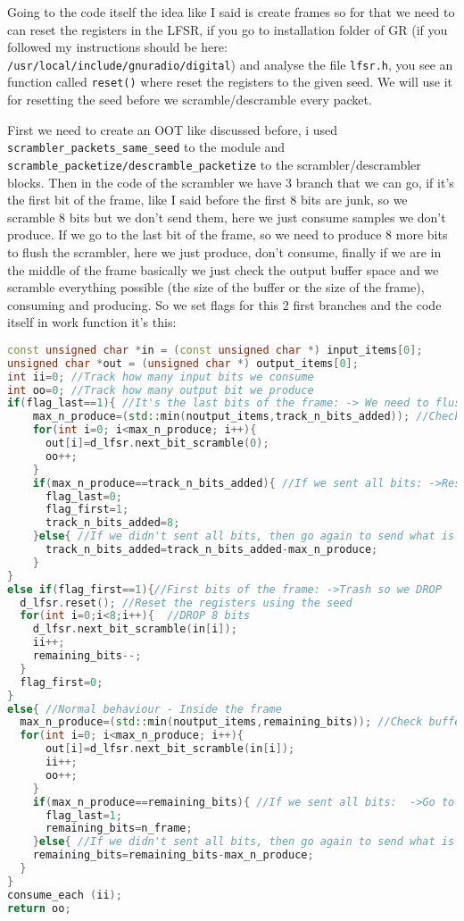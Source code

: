 \documentclass[a4paper, 10pt, conference]{ieeeconf}      %
\begin{document}
    Going to the code itself the idea like I said is create frames so for that we need to can reset the registers in the LFSR, if you go to installation folder of GR (if you followed my instructions should be here: \verb|/usr/local/include/gnuradio/digital|) and analyse the file \verb|lfsr.h|, you see an function called \verb|reset()| where reset the registers to the given seed. We will use it for resetting the seed before we scramble/descramble every packet.
    
    First we need to create an OOT like discussed before, i used \verb|scrambler_packets_same_seed| to the module and \verb|scramble_packetize/descramble_packetize| to the scrambler/descrambler blocks. Then in the code of the scrambler we have 3 branch that we can go, if it's the first bit of the frame, like I said before the first 8 bits are junk, so we scramble 8 bits but we don't send them, here we just consume samples we don't produce. If we go to the last bit of the frame, so we need to produce 8 more bits to flush the scrambler, here we just produce, don't consume, finally if we are in the middle of the frame basically we just check the output buffer space and we scramble everything possible (the size of the buffer or the size of the frame), consuming and producing.
    So we set flags for this 2 first branches and the code itself in work function it's this:
    
\begin{lstlisting}[language=c++, breaklines]
const unsigned char *in = (const unsigned char *) input_items[0];
unsigned char *out = (unsigned char *) output_items[0];
int ii=0; //Track how many input bits we consume
int oo=0; //Track how many output bit we produce
if(flag_last==1){ //It's the last bits of the frame: -> We need to flush it
    max_n_produce=(std::min(noutput_items,track_n_bits_added)); //Check buffer to the amount of bits that we can scramble
    for(int i=0; i<max_n_produce; i++){
      out[i]=d_lfsr.next_bit_scramble(0);
      oo++;
    }
    if(max_n_produce==track_n_bits_added){ //If we sent all bits: ->Reset variables ->Go to the first bits branch
      flag_last=0; 
      flag_first=1;
      track_n_bits_added=8;
    }else{ //If we didn't sent all bits, then go again to send what is possible. 
      track_n_bits_added=track_n_bits_added-max_n_produce;
    }
}
else if(flag_first==1){//First bits of the frame: ->Trash so we DROP
  d_lfsr.reset(); //Reset the registers using the seed
  for(int i=0;i<8;i++){  //DROP 8 bits
    d_lfsr.next_bit_scramble(in[i]);
    ii++;
    remaining_bits--;
  }
  flag_first=0;
}
else{ //Normal behaviour - Inside the frame
  max_n_produce=(std::min(noutput_items,remaining_bits)); //Check buffer to the amount of bits that we can scramble
  for(int i=0; i<max_n_produce; i++){
      out[i]=d_lfsr.next_bit_scramble(in[i]);
      ii++;
      oo++;
    }
    if(max_n_produce==remaining_bits){ //If we sent all bits:  ->Go to last branch to flush ->Reset variables
      flag_last=1;
      remaining_bits=n_frame;
    }else{ //If we didn't sent all bits, then go again to send what is possible. 
    remaining_bits=remaining_bits-max_n_produce;
  }
}
consume_each (ii);
return oo;
\end{lstlisting}
    
\end{document}
